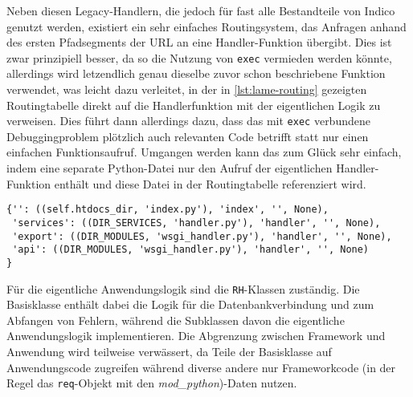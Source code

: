 Neben diesen Legacy-Handlern, die jedoch für fast alle Bestandteile von Indico genutzt werden,
existiert ein sehr einfaches Routingsystem, das Anfragen anhand des ersten Pfadsegments der URL an
eine Handler-Funktion übergibt. Dies ist zwar prinzipiell besser, da so die Nutzung von
\lstinline{exec} vermieden werden könnte, allerdings wird letzendlich genau dieselbe zuvor schon
beschriebene Funktion verwendet, was leicht dazu verleitet, in der in \autoref{lst:lame-routing}
gezeigten Routingtabelle direkt auf die Handlerfunktion mit der eigentlichen Logik zu verweisen.
Dies führt dann allerdings dazu, dass das mit \lstinline{exec} verbundene Debuggingproblem plötzlich
auch relevanten Code betrifft statt nur einen einfachen Funktionsaufruf. Umgangen werden kann das
zum Glück sehr einfach, indem eine separate Python-Datei nur den Aufruf der eigentlichen
Handler-Funktion enthält und diese Datei in der Routingtabelle referenziert wird.

\begin{lstlisting}[caption=Einfaches URL-Routing,label=lst:lame-routing]
{'': ((self.htdocs_dir, 'index.py'), 'index', '', None),
 'services': ((DIR_SERVICES, 'handler.py'), 'handler', '', None),
 'export': ((DIR_MODULES, 'wsgi_handler.py'), 'handler', '', None),
 'api': ((DIR_MODULES, 'wsgi_handler.py'), 'handler', '', None)
}
\end{lstlisting}

Für die eigentliche Anwendungslogik sind die \lstinline{RH}-Klassen zuständig. Die Basisklasse
enthält dabei die Logik für die Datenbankverbindung und zum Abfangen von Fehlern, während die
Subklassen davon die eigentliche Anwendungslogik implementieren. Die Abgrenzung zwischen Framework
und Anwendung wird teilweise verwässert, da Teile der Basisklasse auf Anwendungscode zugreifen
während diverse andere nur Frameworkcode (in der Regel das \lstinline{req}-Objekt mit den
\emph{mod\_python})-Daten nutzen.

